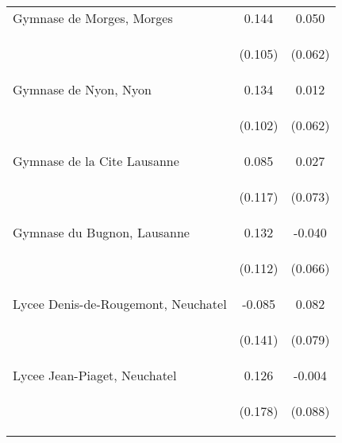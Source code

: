 \begin{tabular}{lcc}
Gymnase de Morges, Morges & 0.144 & 0.050 \\
\vspace{4pt} & \begin{footnotesize}(0.105)\end{footnotesize} & \begin{footnotesize}(0.062)\end{footnotesize} \\
Gymnase de Nyon, Nyon & 0.134 & 0.012 \\
\vspace{4pt} & \begin{footnotesize}(0.102)\end{footnotesize} & \begin{footnotesize}(0.062)\end{footnotesize} \\
Gymnase de la Cite Lausanne & 0.085 & 0.027 \\
\vspace{4pt} & \begin{footnotesize}(0.117)\end{footnotesize} & \begin{footnotesize}(0.073)\end{footnotesize} \\
Gymnase du Bugnon, Lausanne & 0.132 & -0.040 \\
\vspace{4pt} & \begin{footnotesize}(0.112)\end{footnotesize} & \begin{footnotesize}(0.066)\end{footnotesize} \\
Lycee Denis-de-Rougemont, Neuchatel & -0.085 & 0.082 \\
\vspace{4pt} & \begin{footnotesize}(0.141)\end{footnotesize} & \begin{footnotesize}(0.079)\end{footnotesize} \\
Lycee Jean-Piaget, Neuchatel & 0.126 & -0.004 \\
\vspace{4pt} & \begin{footnotesize}(0.178)\end{footnotesize} & \begin{footnotesize}(0.088)\end{footnotesize} \\

\end{tabular}

